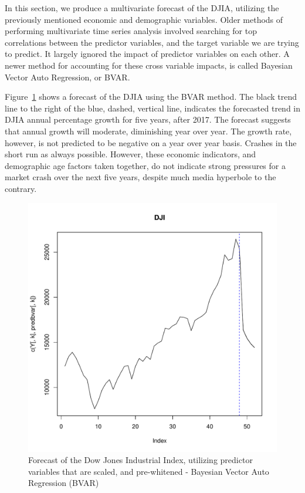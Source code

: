\documentclass[12pt]{article}         %
\begin{document}
In this section, we produce a multivariate forecast of the DJIA, utilizing the previously mentioned economic and demographic variables.  Older methods of performing multivariate time series analysis involved searching for top correlations between the predictor variables, and the target variable we are trying to predict.  It largely ignored the impact of predictor variables on each other.  A newer method for accounting for these cross variable impacts, is called Bayesian Vector Auto Regression, or BVAR.

Figure~\ref{fig:BVARForecast} shows a forecast of the DJIA using the BVAR method.  The black trend line to the right of the blue, dashed, vertical line, indicates the forecasted trend in DJIA annual percentage growth for five years, after 2017.  The forecast suggests that annual growth will moderate, diminishing year over year.  The growth rate, however, is not predicted to be negative on a year over year basis.  Crashes in the short run as always possible.  However, these economic indicators, and demographic age factors taken together, do not indicate strong pressures for a market crash over the next five years, despite much media hyperbole to the contrary.

\begin{figure}[h!]
\begin{center}
\includegraphics[width=\linewidth]{plots/DJI_forecast_yrly.pdf}
\caption{Forecast of the Dow Jones Industrial Index, utilizing predictor variables that are scaled, and pre-whitened - Bayesian Vector Auto Regression (BVAR)}
\label{fig:BVARForecast}
\end{center}
\end{figure}
\end{document}
